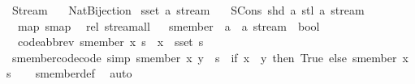 %
\begin{isabellebody}%
%
%
\isadelimdocument
%
\endisadelimdocument
%
\isatagdocument
%
\isamarkuptrue%
%
\endisatagdocument
{\isafolddocument}%
%
\isadelimdocument
%
\endisadelimdocument
%
\isadelimtheory
%
\endisadelimtheory
%
\isatagtheory
{}\isamarkupfalse%
\ Stream\isanewline
\ \ \ Nat{\isacharunderscore}Bijection\isanewline
{}%
\endisatagtheory
{\isafoldtheory}%
%
\isadelimtheory
\isanewline
%
\endisadelimtheory
\isanewline
{}\isamarkupfalse%
\ {\isacharparenleft}sset{\isacharcolon}\ {\isacharprime}a{\isacharparenright}\ stream\ {\isacharequal}\isanewline
\ \ SCons\ {\isacharparenleft}shd{\isacharcolon}\ {\isacharprime}a{\isacharparenright}\ {\isacharparenleft}stl{\isacharcolon}\ {\isachardoublequoteopen}{\isacharprime}a\ stream{\isachardoublequoteclose}{\isacharparenright}\ {\isacharparenleft}\ {\isachardoublequoteopen}{\isacharhash}{\isacharhash}{\isachardoublequoteclose}\ {}{}{\isacharparenright}\isanewline
{}\isanewline
\ \ map{\isacharcolon}\ smap\isanewline
\ \ rel{\isacharcolon}\ stream{\isacharunderscore}all{}\isanewline
\isanewline
{}\isamarkupfalse%
\isanewline
{}\isanewline
\isanewline
%
\isanewline
{}\ \isamarkupfalse%
\ smember\ {\isacharcolon}{\isacharcolon}\ {\isachardoublequoteopen}{\isacharprime}a\ {\isasymRightarrow}\ {\isacharprime}a\ stream\ {\isasymRightarrow}\ bool{\isachardoublequoteclose}\ \isanewline
\ \ {\isacharbrackleft}code{\isacharunderscore}abbrev{\isacharbrackright}{\isacharcolon}\ {\isachardoublequoteopen}smember\ x\ s\ {\isasymlongleftrightarrow}\ x\ {\isasymin}\ sset\ s{\isachardoublequoteclose}\isanewline
\isanewline
{}\isamarkupfalse%
\ smember{\isacharunderscore}code{\isacharbrackleft}code{\isacharcomma}\ simp{\isacharbrackright}{\isacharcolon}\ {\isachardoublequoteopen}smember\ x\ {\isacharparenleft}y\ {\isacharhash}{\isacharhash}\ s{\isacharparenright}\ {\isacharequal}\ {\isacharparenleft}if\ x\ {\isacharequal}\ y\ then\ True\ else\ smember\ x\ s{\isacharparenright}{\isachardoublequoteclose}\isanewline
%
\isadelimproof
\ \ %
\endisadelimproof
%
\isatagproof
{}\isamarkupfalse%
\ smember{\isacharunderscore}def\ \isamarkupfalse%
\ auto%
\endisatagproof
{\isafoldproof}%
%
\isadelimproof

\end{isabellebody}
